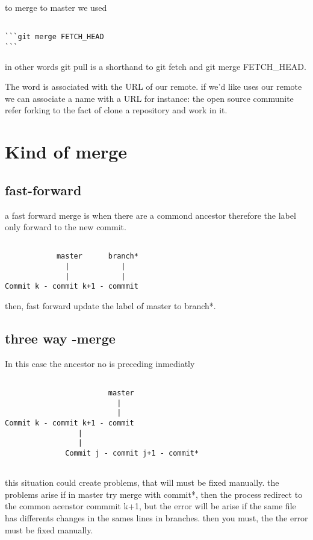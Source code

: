 \documentclass[10pt,a4paper]{article}
\begin{document}
to merge to master we used
\begin{verbatim}

```git merge FETCH_HEAD
```
\end{verbatim}

in other words git pull is a shorthand to git fetch and git merge FETCH_HEAD.




The word  is associated with the URL of our remote. if we'd like uses our remote we can associate a name with a URL for instance:
the open source communite refer forking to the fact of clone a repository and work in it.

\section{Kind of merge}

\subsection{fast-forward}

a fast forward merge is when there are a commond ancestor therefore the label only forward to the new commit.

\begin{verbatim}

            master      branch*
              |            |     
              |            |     
Commit k - commit k+1 - commmit 

\end{verbatim}
then, fast forward update the label of
master to branch*.


\subsection{three way -merge}

In this case the ancestor no is preceding inmediatly
\begin{verbatim}

                        master
                          |      
                          |
Commit k - commit k+1 - commit 
                 |
                 | 
              Commit j - commit j+1 - commit*
                         
\end{verbatim}
this situation could create problems, that will must be fixed manually.
the problems arise if in master try merge with commit*, then the process 
redirect to  the common acenstor commmit k+1, but the error will be arise
if the same file has differents changes in the sames lines in branches.
then you must, the the error must be fixed manually. 
\end{document}
